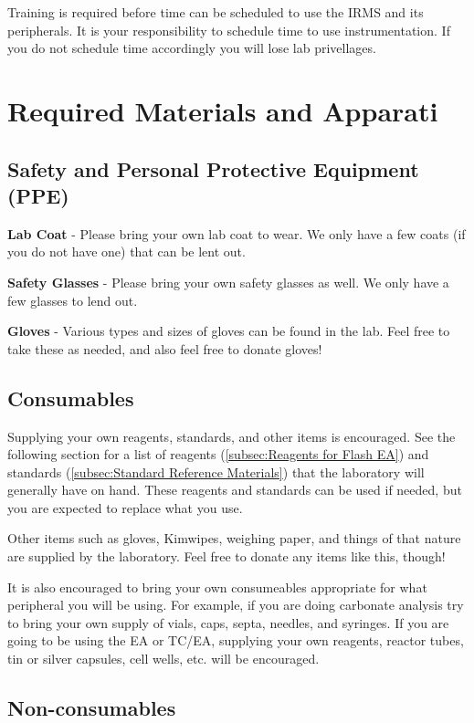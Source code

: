 \documentclass[12pt]{../SOP3}\usepackage[]{graphicx}\usepackage[]{color}
\begin{document}
\NP Training is required before time can be scheduled to use the IRMS and its peripherals. It is your responsibility to schedule time to use instrumentation. If you do not schedule time accordingly you will lose lab privellages.


\section{Required Materials and Apparati}

\subsection{Safety and Personal Protective Equipment (PPE)}

\NP \textbf{Lab Coat} - Please bring your own lab coat to wear. We only have a few coats (if you do not have one) that can be lent out.

\NP \textbf{Safety Glasses} - Please bring your own safety glasses as well. We only have a few glasses to lend out.

\NP \textbf{Gloves} - Various types and sizes of gloves can be found in the lab. Feel free to take these as needed, and also feel free to donate gloves!

\subsection{Consumables}

\NP Supplying your own reagents, standards, and other items is encouraged. See the following section for a list of reagents (\ref{subsec:Reagents for Flash EA}) and standards (\ref{subsec:Standard Reference Materials}) that the laboratory will generally have on hand. These reagents and standards can be used if needed, but you are expected to replace what you use.

\NP Other items such as gloves, Kimwipes, weighing paper, and things of that nature are supplied by the laboratory. Feel free to donate any items like this, though!

\NP It is also encouraged to bring your own consumeables appropriate for what peripheral you will be using. For example, if you are doing carbonate analysis try to bring your own supply of vials, caps, septa, needles, and syringes. If you are going to be using the EA or TC/EA, supplying your own reagents, reactor tubes, tin or silver capsules, cell wells, etc. will be encouraged.

\subsection{Non-consumables}
\end{document}
